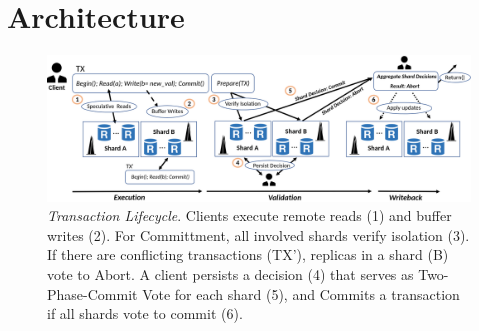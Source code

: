 \section{Architecture}
\begin{figure}[!th]
\begin{center}
\includegraphics[width= \textwidth]{./figures/Archi.png}
\end{center}
\caption{{\em Transaction Lifecycle}. Clients execute remote reads (1) and buffer writes (2). For Committment, all involved shards verify isolation (3). If there are conflicting transactions (TX'), replicas in a shard (B) vote to Abort. A client persists a decision (4) that serves as Two-Phase-Commit Vote for each shard (5), and Commits a transaction if all shards vote to commit (6).}
\label{fig:Figure1}
\end{figure}

